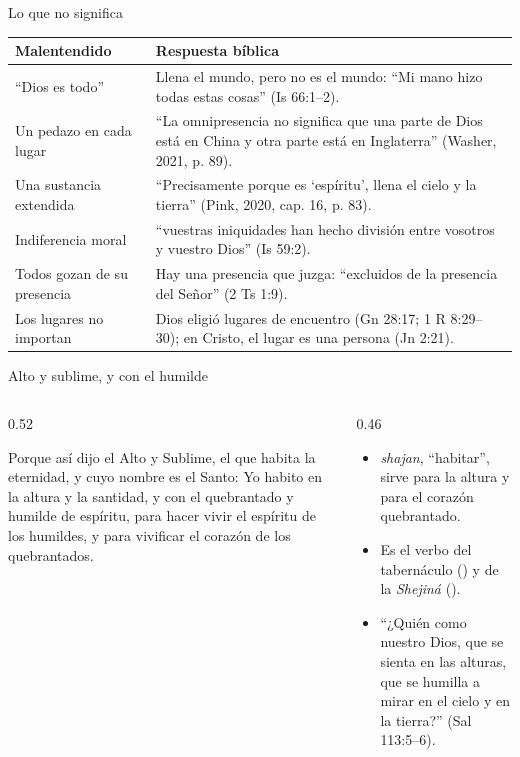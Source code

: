 \begin{frame}{Lo que no significa}
\scriptsize\renewcommand{\arraystretch}{1.15}
\begin{tabular}{@{}>{\RaggedRight\arraybackslash}p{3.0cm}>{\RaggedRight\arraybackslash}p{8.8cm}@{}}
\toprule
\textbf{Malentendido} & \textbf{Respuesta bíblica} \\ \midrule
``Dios es todo'' & Llena el mundo, pero no es el mundo: ``Mi mano hizo todas estas cosas'' (Is 66:1--2). \\
Un pedazo en cada lugar & ``La omnipresencia no significa que una parte de Dios está en China y otra parte está en Inglaterra'' (Washer, 2021, p. 89). \\
Una sustancia extendida & ``Precisamente porque es `espíritu', llena el cielo y la tierra'' (Pink, 2020, cap. 16, p. 83). \\
Indiferencia moral & ``vuestras iniquidades han hecho división entre vosotros y vuestro Dios'' (Is 59:2). \\
Todos gozan de su presencia & Hay una presencia que juzga: ``excluidos de la presencia del Señor'' (2 Ts 1:9). \\
Los lugares no importan & Dios eligió lugares de encuentro (Gn 28:17; 1 R 8:29--30); en Cristo, el lugar es una persona (Jn 2:21). \\
\bottomrule
\end{tabular}
\end{frame}

\begin{frame}{Alto y sublime, y con el humilde}
\begin{columns}[c,onlytextwidth]
\begin{column}{0.52\textwidth}
\begin{cita}[fontupper=\scriptsize\itshape]Porque así dijo el Alto y Sublime, el que habita la eternidad, y cuyo nombre es el Santo: Yo habito en la altura y la santidad, y con el quebrantado y humilde de espíritu, para hacer vivir el espíritu de los humildes, y para vivificar el corazón de los quebrantados.\end{cita}
\end{column}
\begin{column}{0.46\textwidth}\small
\begin{itemize}
\item {} \emph{shajan}, ``habitar'', sirve para la altura y para el corazón quebrantado.
\item Es el verbo del tabernáculo () y de la \emph{Shejiná} ().
\item ``¿Quién como \SENOR{} nuestro Dios, que se sienta en las alturas, que se humilla a mirar en el cielo y en la tierra?'' (Sal 113:5--6).
\end{itemize}
\end{column}
\end{columns}
\end{frame}

